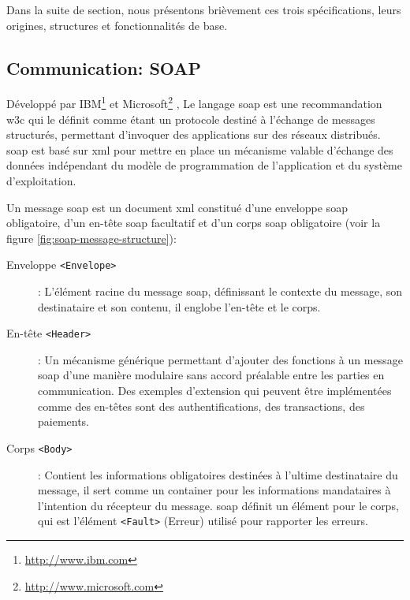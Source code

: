 

Dans la suite de section, nous présentons brièvement ces trois
spécifications, leurs origines, structures et fonctionnalités de base.

  \subsection{Communication: SOAP}
  \label{sec:soap}
  Développé par IBM\footnote{\url{http://www.ibm.com}} et
  Microsoft\footnote{\url{http://www.microsoft.com}}
  \cite{box2000simple}, Le langage \acrshort{soap} est une
  recommandation \acrshort{w3c} \cite{mitra2003soap} qui le définit
  comme étant un protocole destiné à l'échange de messages structurés,
  permettant d'invoquer des applications sur des réseaux
  distribués. \acrshort{soap} est basé sur \acrshort{xml} pour mettre
  en place un mécanisme valable d'échange des données indépendant du
  modèle de programmation de l'application et du système
  d'exploitation.\medskip

  Un message \acrshort{soap} est un document \acrshort{xml} constitué
  d'une enveloppe \acrshort{soap} obligatoire, d'un en-tête
  \acrshort{soap} facultatif et d'un corps \acrshort{soap} obligatoire
  (voir la figure \ref{fig:soap-message-structure}):

  

  \SpecialItem
  \renewcommand{\descriptionlabel}[1]{\hspace{1cm}\texttt{#1}}
  \begin{description}
  \item[Enveloppe \texttt{<Envelope>}]: L'élément racine du message
    \acrshort{soap}, définissant le contexte du message, son
    destinataire et son contenu, il englobe l'en-tête et le corps.

  \item[En-tête \texttt{<Header>}]: Un mécanisme générique permettant
    d'ajouter des fonctions à un message \acrshort{soap} d'une manière
    modulaire sans accord préalable entre les parties en
    communication.  Des exemples d'extension qui peuvent être
    implémentées comme des en-têtes sont des authentifications, des
    transactions, des paiements.

  \item[Corps \texttt{<Body>}]: Contient les informations obligatoires
    destinées à l'ultime destinataire du message, il sert comme un
    container pour les informations mandataires à l'intention du
    récepteur du message. \acrshort{soap} définit un élément pour le
    corps, qui est l'élément \texttt{<Fault>} (Erreur) utilisé pour
    rapporter les erreurs.
  \end{description}
  \enddescription

